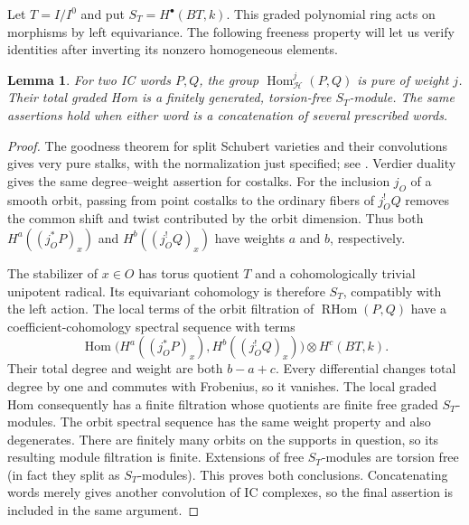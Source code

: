 \documentclass[11pt]{article}
\numberwithin{equation}{section}
\newtheorem{lemma}[theorem]{Lemma}
\theoremstyle{definition}
\theoremstyle{remark}
\newcommand{\Hom}{\operatorname{Hom}}
\newcommand{\RHom}{\operatorname{RHom}}
\begin{document}
Let $T=I/I^0$ and put $S_T=H^\bullet(BT,k)$.  This graded polynomial
ring acts on morphisms by left equivariance.  The following freeness
property will let us verify identities after inverting its nonzero
homogeneous elements.

\begin{lemma}\label{enh:pure-homs}
For two IC words $P,Q$, the group
$\Hom^j_{\mathscr H}(P,Q)$ is pure of weight $j$.
Their total graded Hom is a finitely generated, torsion-free
$S_T$-module.  The same assertions hold when either word is a
concatenation of several prescribed words.
\end{lemma}

\begin{proof}
The goodness theorem for split Schubert varieties and their
convolutions gives very pure stalks, with the normalization just
specified; see \cite[Theorem~2.2.1 and Corollary~2.2.3]{Enh:DCHL}.
Verdier duality gives the same degree--weight assertion for
costalks.  For the inclusion $j_O$ of a smooth orbit, passing from
point costalks to the ordinary fibers of $j_O^!Q$ removes the common
shift and twist contributed by the orbit dimension.  Thus both
$H^a((j_O^*P)_x)$ and $H^b((j_O^!Q)_x)$ have weights $a$ and $b$,
respectively.

The stabilizer of $x\in O$ has torus quotient $T$ and a
cohomologically trivial unipotent radical.  Its equivariant
cohomology is therefore $S_T$, compatibly with the left action.
The local terms of the orbit filtration of $\RHom(P,Q)$ have a
coefficient-cohomology spectral sequence with terms
\begin{equation}\label{enh:orbit-hom-term}
 \Hom\bigl(H^a((j_O^*P)_x),H^b((j_O^!Q)_x)\bigr)
       \otimes H^c(BT,k).
\end{equation}
Their total degree and weight are both $b-a+c$.  Every differential
changes total degree by one and commutes with Frobenius, so it
vanishes.  The local graded Hom consequently has a finite filtration
whose quotients are finite free graded $S_T$-modules.
The orbit spectral sequence has the same weight property and also
degenerates.  There are finitely many orbits on the supports in
question, so its resulting module filtration is finite.
Extensions of free $S_T$-modules are torsion free (in fact they split
as $S_T$-modules).  This proves both conclusions.
Concatenating words merely gives another convolution of IC
complexes, so the final assertion is included in the same argument.
\end{proof}
\end{document}

